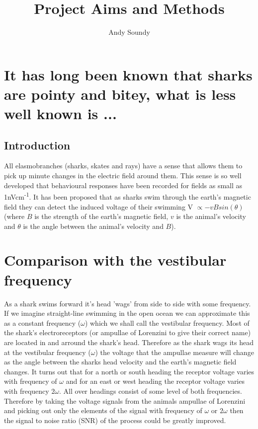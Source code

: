 \documentclass[12pt]{article}
\title{Project Aims and Methods}
\author{Andy Soundy}
\begin{document}
\maketitle

\section{It has long been known that sharks are pointy and bitey, what is less well known is ...}
\subsection{Introduction}
All elasmobranches (sharks, skates and rays) have a sense that allows them to pick up minute changes in the electric field around them. This sense is so well developed that behavioural responses have been recorded for fields as small as 1nVcm\textsuperscript{-1}\cite{Kajiura:2002}. It has been proposed that as sharks swim through the earth's magnetic field they can detect the induced voltage of their swimming V $\propto -vBsin(\theta )$ (where $B$ is the strength of the earth's magnetic field, $v$ is the animal's velocity and $\theta$ is the angle between the animal's velocity and $B$).


\section{Comparison with the vestibular frequency}
As a shark swims forward it's head 'wags' from side to side with some frequency. If we imagine straight-line swimming in the open ocean we can approximate this as a constant frequency ($\omega$) which we shall call the vestibular frequency. Most of the shark's electroreceptors (or ampullae of Lorenzini to give their correct name) are located in and arround the shark's head. Therefore as the shark wags its head at the vestibular frequency ($\omega$) the voltage that the ampullae measure will change as the angle between the sharks head velocity and the earth's magnetic field changes. It turns out that for a north or south heading the receptor voltage varies with frequency of $\omega$ and for an east or west heading the receptor voltage varies with frequency $2\omega$. All over headings consist of some level of both frequencies. Therefore by taking the voltage signals from the animals ampullae of Lorenzini and picking out only the elements of the signal with frequency of $\omega$ or $2\omega$ then the signal to noise ratio (SNR) of the process could be greatly improved.
\end{document}
